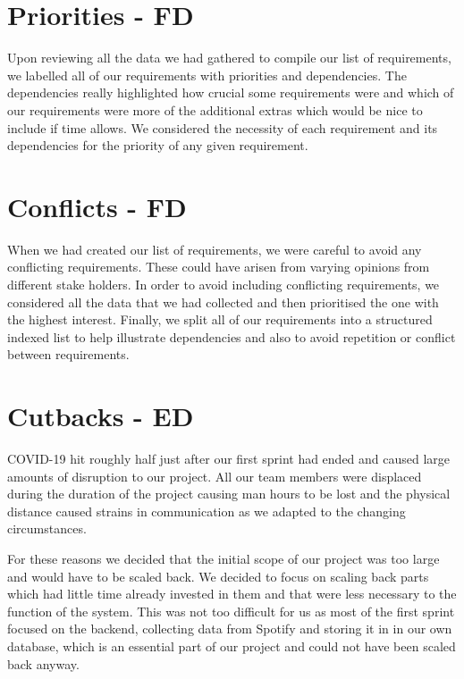 \documentclass[10pt, notitlepage]{report}
\begin{document}
\section{Priorities - FD}

Upon reviewing all the data we had gathered to compile our list of requirements, we labelled all of our requirements with priorities and dependencies. The dependencies really highlighted how crucial some requirements were and which of our requirements were more of the additional extras which would be nice to include if time allows. We considered the necessity of each requirement and its dependencies for the priority of any given requirement.

\section{Conflicts - FD}

When we had created our list of requirements, we were careful to avoid any conflicting requirements. These could have arisen from varying opinions from different stake holders. In order to avoid including conflicting requirements, we considered all the data that we had collected and then prioritised the one with the highest interest. Finally, we split all of our requirements into a structured indexed list to help illustrate dependencies and also to avoid repetition or conflict between requirements.

\section{Cutbacks - ED}

COVID-19 hit roughly half just after our first sprint had ended and caused large amounts of disruption to our project. All our team members were displaced during the duration of the project causing man hours to be lost and the physical distance caused strains in communication as we adapted to the changing circumstances.

For these reasons we decided that the initial scope of our project was too large and would have to be scaled back. We decided to focus on scaling back parts which had little time already invested in them and that were less necessary to the function of the system. This was not too difficult for us as most of the first sprint focused on the backend, collecting data from Spotify and storing it in in our own database, which is an essential part of our project and could not have been scaled back anyway.
\end{document}
